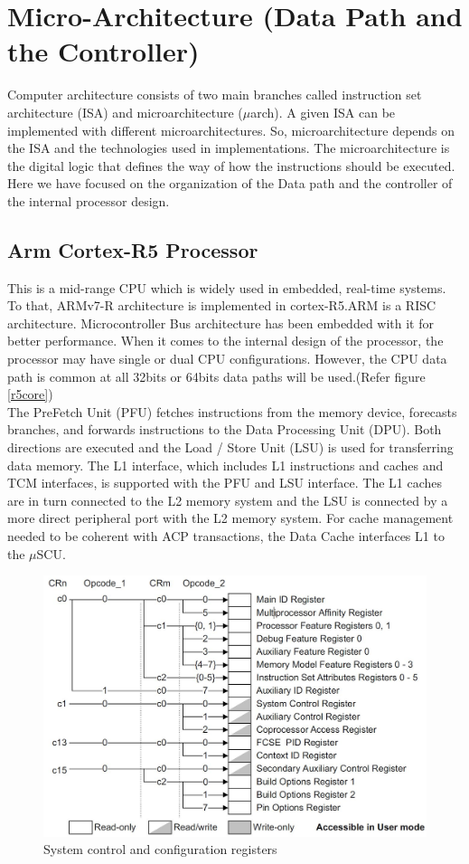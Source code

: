\documentclass[a4paper,11pt]{article}
\begin{document}
\pagebreak
\section{Micro-Architecture (Data Path and the Controller)}
Computer architecture consists of two main branches called instruction set architecture (ISA) and microarchitecture ($\mu$arch). A given ISA can be implemented with different microarchitectures. So, microarchitecture depends on the ISA and the technologies used in implementations. The microarchitecture is the digital logic that defines the way of how the instructions should be executed. Here we have focused on the organization of the Data path and the controller of the internal processor design.
\subsection{Arm Cortex-R5 Processor}
This is a mid-range CPU which is widely used in embedded, real-time systems. To that, ARMv7-R architecture is implemented in cortex-R5.ARM is a RISC architecture. Microcontroller Bus architecture has been embedded with it for better performance. When it comes to the internal design of the processor, the processor may have single or dual CPU configurations. However, the CPU data path is common at all 32bits or 64bits data paths will be used.(Refer figure \ref{r5core}) \\

The PreFetch Unit (PFU) fetches instructions from the memory device, forecasts branches, and forwards instructions to the Data Processing Unit (DPU). Both directions are executed and the Load / Store Unit (LSU) is used for transferring data memory. The L1 interface, which includes L1 instructions and caches and TCM interfaces, is supported with the PFU and LSU interface. The L1 caches are in turn connected to the L2 memory system and the LSU is connected by a more direct peripheral port with the L2 memory system. For cache management needed to be coherent with ACP transactions, the Data Cache interfaces L1 to the $\mu$SCU.\\

\begin{figure}[!h]
	\centering
	\includegraphics[scale= 0.34]{figures/syscc}
	\caption{System control and configuration registers}
\end{figure}
\end{document}
